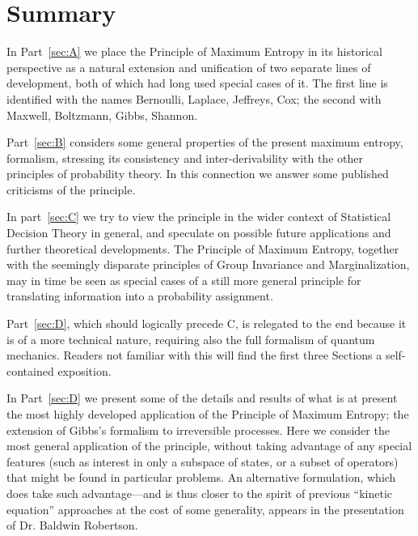 \section*{Summary}
In Part~\ref{sec:A} we place the Principle of Maximum Entropy in its historical perspective as a natural extension and unification of two separate lines of development, both of which had long used special cases of it.
The first line is identified with the names Bernoulli, Laplace, Jeffreys, Cox; the second with Maxwell, Boltzmann, Gibbs, Shannon.

Part~\ref{sec:B} considers some general properties of the present maximum entropy, formalism, stressing its consistency and inter-derivability with the other principles of probability theory.
In this connection we answer some published criticisms of the principle.

In part~\ref{sec:C} we try to view the principle in the wider context of Statistical Decision Theory in general, and speculate on possible future applications and further theoretical developments.
The Principle of Maximum Entropy, together with the seemingly disparate principles of Group Invariance and Marginalization, may in time be seen as special cases of a still more general principle for translating information into a probability assignment.

Part~\ref{sec:D}, which should logically precede C, is relegated to the end because it is of a more technical nature, requiring also the full formalism of quantum mechanics.
Readers not familiar with this will find the first three Sections a self-contained exposition.

In Part~\ref{sec:D} we present some of the details and results of what is at present the most highly developed application of the Principle of Maximum Entropy; the extension of Gibbs's formalism to irreversible processes.
Here we consider the most general application of the principle, without taking advantage of any	special features (such as interest in only a subspace of states, or a subset of operators) that might be found in particular problems.
An alternative formulation, which does take such advantage---and is thus closer to the spirit of previous ``kinetic equation'' approaches at the cost of some generality, appears in the presentation of Dr. Baldwin Robertson.